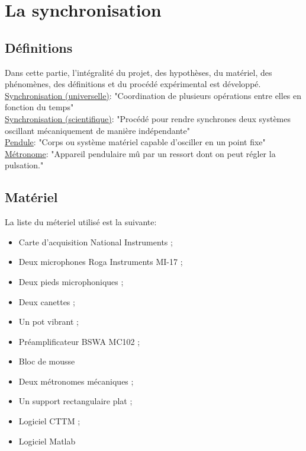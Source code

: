 \documentclass[a4paper,11pt]{report}
\begin{document}
\newpage
\null
\thispagestyle{empty}
\chapter{La synchronisation}
\section{Définitions}
Dans cette partie, l'intégralité du projet, des hypothèses, du matériel, des phénomènes, des définitions et du procédé expérimental est développé.\\
\underline{Synchronisation (universelle)}: "Coordination de plusieurs opérations entre elles en fonction du temps"\cite{wiki}\\
\underline{Synchronisation (scientifique)}: "Procédé pour rendre synchrones deux systèmes oscillant mécaniquement de manière indépendante"\cite{cntrl}\\
\underline{Pendule}: "Corps ou système matériel capable d'osciller en un point fixe"\cite{ikonet}\\
\underline{Métronome}: "Appareil pendulaire mû par un ressort dont on peut régler la pulsation."\cite{pend} \\

\section{Matériel}

La liste du méteriel utilisé est la suivante:\\
\begin{itemize}[label=\textbullet, leftmargin=* ,parsep=0cm,itemsep=0cm,topsep=0cm]
\item Carte d'acquisition National Instruments ;
\item Deux microphones Roga Instruments MI-17 ;
\item Deux pieds microphoniques ;
\item Deux canettes ;
\item Un pot vibrant ;
\item Préamplificateur BSWA MC102 ;
\item Bloc de mousse
\item Deux métronomes mécaniques ;
\item Un support rectangulaire plat ;
\item Logiciel CTTM ;
\item Logiciel Matlab
\end{itemize}
\end{document}
